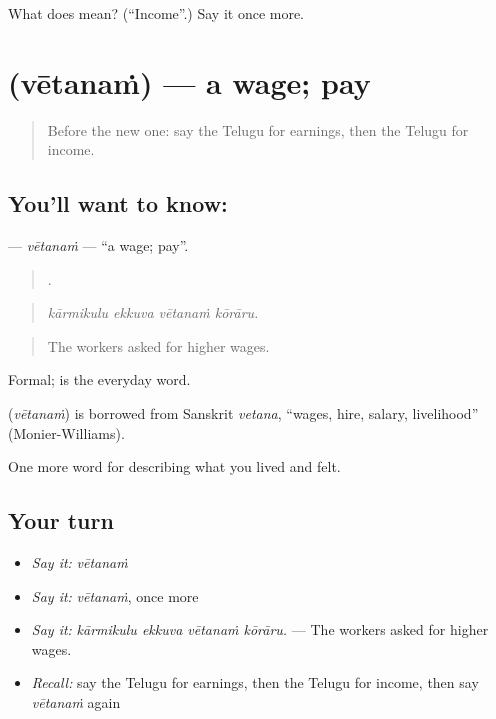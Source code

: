 \begin{tcolorbox}[breakable,colback=teal!4,colframe=teal!35!black,title={Before you move on}]
What does  mean? (\textquotedblleft{}Income\textquotedblright{}.) Say it once more.
\end{tcolorbox}
\section[\texorpdfstring{\te{వేతనం} (vētanaṁ)}{వేతనం (vētanaṁ)}]{ (vētanaṁ) — a wage; pay}

\label{lesson:TE-C525-vetanam}



\begin{quote}
Before the new one: say the Telugu for earnings, then the Telugu for income.
\end{quote}

\subsection*{You'll want to know: }
\textbf{} — \emph{vētanaṁ} — \textquotedblleft{}a wage; pay\textquotedblright{}.

\begin{quote}
   .
\end{quote}

\begin{quote}
\emph{kārmikulu ekkuva vētanaṁ kōrāru.}
\end{quote}

\begin{quote}
The workers asked for higher wages.
\end{quote}

Formal;  is the everyday word.

\begin{cousinweb}
\textbf{} (\emph{vētanaṁ}) is borrowed from Sanskrit \emph{vetana}, \textquotedblleft{}wages, hire, salary, livelihood\textquotedblright{} (Monier-Williams).
\end{cousinweb}

\begin{grammarlens}[title={What you've built}]
One more word for describing what you lived and felt.
\end{grammarlens}

\subsection*{Your turn}
\begin{itemize}
\raggedright
  \item \emph{Say it:} \emph{vētanaṁ}
  \item \emph{Say it:} \emph{vētanaṁ}, once more
  \item \emph{Say it:} \emph{kārmikulu ekkuva vētanaṁ kōrāru.} — The workers asked for higher wages.
  \item \emph{Recall:} say the Telugu for earnings, then the Telugu for income, then say \emph{vētanaṁ} again
\end{itemize}

